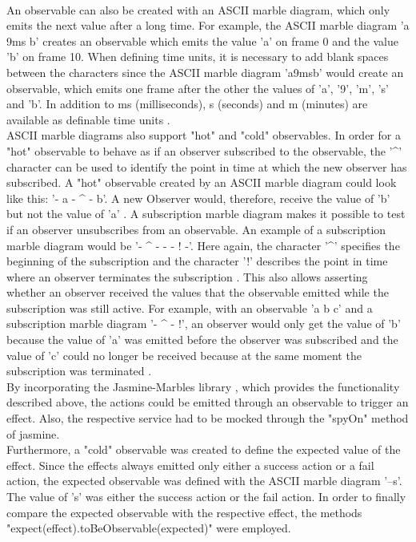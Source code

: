 \documentclass[Bachelor,BIF,english]{twbook}
\begin{document}
\\[\baselineskip]
An observable can also be created with an ASCII marble diagram, which only emits the next value after a long time. For example, the ASCII marble diagram 'a 9ms b' creates an observable which emits the value 'a' on frame 0 and the value 'b' on frame 10. When defining time units, it is necessary to add blank spaces between the characters since the ASCII marble diagram 'a9msb' would create an observable, which emits one frame after the other the values of 'a', '9', 'm', 's' and 'b'. In addition to ms (milliseconds), s (seconds) and m (minutes) are available as definable time units \cite{TestingMarblesTime}.
\\[\baselineskip]
ASCII marble diagrams also support "hot" and "cold" observables. In order for a "hot" observable to behave as if an observer subscribed to the observable, the '\string^' character can be used to identify the point in time at which the new observer has subscribed. A "hot" observable created by an ASCII marble diagram could look like this: '- a - \string^ - b'. A new Observer would, therefore, receive the value of 'b' but not the value of 'a' \cite{TestingMarblesSyntax}. A subscription marble diagram makes it possible to test if an observer unsubscribes from an observable. An example of a subscription marble diagram would be '- \string^ - - - ! -'. Here again, the character '\string^' specifies the beginning of the subscription and the character '!' describes the point in time where an observer terminates the subscription \cite{TestingMarblesSubscribe}. This also allows asserting whether an observer received the values that the observable emitted while the subscription was still active. For example, with an observable 'a b c' and a subscription marble diagram '- \string ^ - !', an observer would only get the value of 'b' because the value of 'a' was emitted before the observer was subscribed and the value of 'c' could no longer be received because at the same moment the subscription was terminated \cite{TestingMarblesSubExamples} \cite{TestingMarblesSubscribe}.
\\[\baselineskip]
By incorporating the Jasmine-Marbles library \cite{TestingMarbles}, which provides the functionality described above, the actions could be emitted through an observable to trigger an effect. Also, the respective service had to be mocked through the "spyOn" method of jasmine.
\\[\baselineskip]
Furthermore, a "cold" observable was created to define the expected value of the effect. Since the effects always emitted only either a success action or a fail action, the expected observable was defined with the ASCII marble diagram '--s'. The value of 's' was either the success action or the fail action. In order to finally compare the expected observable with the respective effect, the methods "expect(effect).toBeObservable(expected)" were employed.
\end{document}
